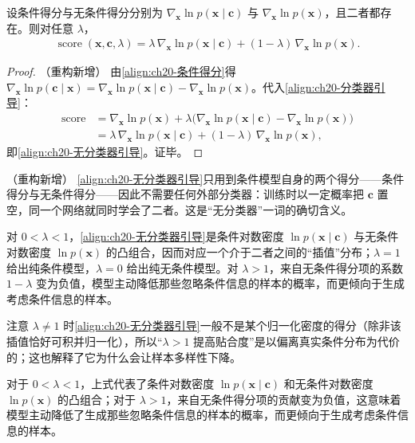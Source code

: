 \documentclass[../../main.tex]{subfiles}
\begin{document}
\begin{proposition}\label{proposition:ch20-无分类器引导}
设条件得分与无条件得分分别为 $\nabla_{\bm{x}}\ln p(\bm{x}\mid\bm{c})$ 与 $\nabla_{\bm{x}}\ln p(\bm{x})$，且二者都存在。则对任意 $\lambda$，
\begin{align}
\operatorname{score}(\bm{x},\bm{c},\lambda)=\lambda\,\nabla_{\bm{x}}\ln p(\bm{x}\mid\bm{c})+(1-\lambda)\,\nabla_{\bm{x}}\ln p(\bm{x}).
\label{align:ch20-无分类器引导}
\end{align}
\end{proposition}

\begin{proof}（重构新增）
由\eqref{align:ch20-条件得分}得 $\nabla_{\bm{x}}\ln p(\bm{c}\mid\bm{x})=\nabla_{\bm{x}}\ln p(\bm{x}\mid\bm{c})-\nabla_{\bm{x}}\ln p(\bm{x})$。代入\eqref{align:ch20-分类器引导}：
\begin{align*}
\operatorname{score}&=\nabla_{\bm{x}}\ln p(\bm{x})+\lambda\big(\nabla_{\bm{x}}\ln p(\bm{x}\mid\bm{c})-\nabla_{\bm{x}}\ln p(\bm{x})\big)\\
&=\lambda\,\nabla_{\bm{x}}\ln p(\bm{x}\mid\bm{c})+(1-\lambda)\,\nabla_{\bm{x}}\ln p(\bm{x}),
\end{align*}
即\eqref{align:ch20-无分类器引导}。证毕。
\end{proof}

\begin{remark}（重构新增）
\eqref{align:ch20-无分类器引导}只用到条件模型自身的两个得分——条件得分与无条件得分——因此不需要任何外部分类器：训练时以一定概率把 $\bm{c}$ 置空，同一个网络就同时学会了二者。这是“无分类器”一词的确切含义。\par
对 $0<\lambda<1$，\eqref{align:ch20-无分类器引导}是条件对数密度 $\ln p(\bm{x}\mid\bm{c})$ 与无条件对数密度 $\ln p(\bm{x})$ 的凸组合，因而对应一个介于二者之间的“插值”分布；$\lambda=1$ 给出纯条件模型，$\lambda=0$ 给出纯无条件模型。对 $\lambda>1$，来自无条件得分项的系数 $1-\lambda$ 变为负值，模型主动降低那些忽略条件信息的样本的概率，而更倾向于生成考虑条件信息的样本。\par
注意 $\lambda\neq1$ 时\eqref{align:ch20-无分类器引导}一般不是某个归一化密度的得分（除非该插值恰好可积并归一化），所以“$\lambda>1$ 提高贴合度”是以偏离真实条件分布为代价的；这也解释了它为什么会让样本多样性下降。
\end{remark}

对于 $0<\lambda<1$，上式代表了条件对数密度 $\ln p(\bm{x}\mid\bm{c})$ 和无条件对数密度 $\ln p(\bm{x})$ 的凸组合；对于 $\lambda>1$，来自无条件得分项的贡献变为负值，这意味着模型主动降低了生成那些忽略条件信息的样本的概率，而更倾向于生成考虑条件信息的样本。
\end{document}
